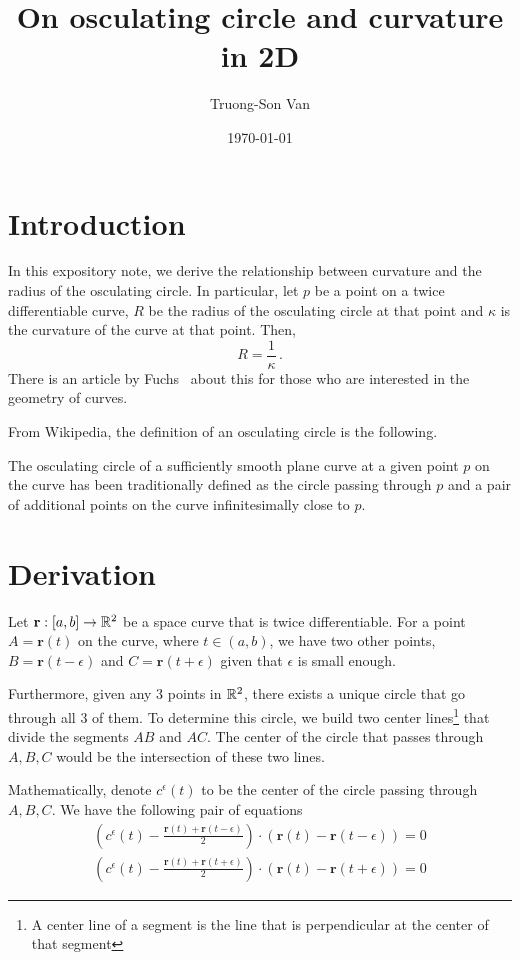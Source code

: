\documentclass[12pt]{amsart}
\title{ On osculating circle and curvature in 2D }
\author{Truong-Son Van}
\date{\today}
\newcommand{\vect}{\mathbf}
\begin{document}
\maketitle


\section{Introduction}
In this expository note, we derive the relationship between curvature and the radius of the osculating circle.
In particular, let $p$ be a point on a twice differentiable curve, $R$ be
the radius of the osculating circle at that point and $\kappa$ is the curvature of the curve 
at that point. Then,
\begin{equation*}
    R = \frac{1}{\kappa} \,.
\end{equation*}
There is an article by Fuchs~\cite{Fuchs2013} about this for those who are interested in the geometry of curves.

From Wikipedia, the definition of an osculating circle is the following.

\begin{definition}
The osculating circle of a sufficiently smooth plane curve at a given point $p$
on the curve has been traditionally defined as the circle passing through $p$
and a pair of additional points on the curve infinitesimally close to $p$.
\end{definition}

\section{Derivation}

Let $\vect{r}:[a,b]\to \R^2$  be a space curve that is twice differentiable.
For a point $A=\vect{r}(t)$ on the curve, where $t\in (a,b)$, we have two other points,
 $B=\vect{r}(t-\epsilon)$ and $C=\vect{r}(t+\epsilon)$ given that $\epsilon$ is small enough.

 Furthermore, given any 3 points in $\mathbb{R}^2$, there exists a unique circle that go through
 all 3 of them. 
 To determine this circle, we build two center lines\footnote{A center line 
 of a segment is the line that is perpendicular at the center of that segment}
     that divide the segments $AB$ and $AC$.
     The center of the circle that passes through $A,B,C$  would be the intersection of these two lines.

     Mathematically, denote $c^\epsilon(t)$ to be the center of the circle passing through $A,B,C$.
     We have the following pair of equations
     \begin{align*}
         \left(c^\epsilon(t) - \frac{\vect{r}(t) + \vect{r}(t-\epsilon)}{2} \right)\cdot\left( \vect{r}(t) - \vect{r}(t-\epsilon) \right) = 0  \\
         \left(c^\epsilon(t) - \frac{\vect{r}(t) + \vect{r}(t+\epsilon)}{2} \right)\cdot\left( \vect{r}(t) - \vect{r}(t+\epsilon) \right) = 0  
     \end{align*}
\end{document}
